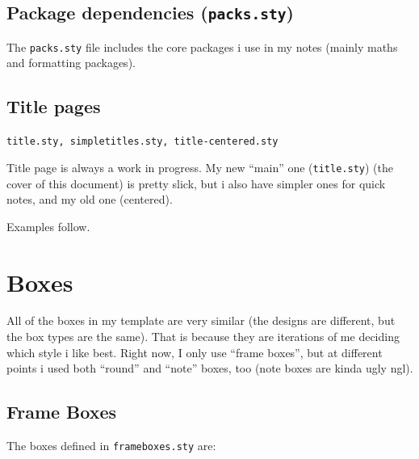 \documentclass[a4paper,12pt]{report}
\begin{document}
\section{Package dependencies (\texttt{packs.sty})}

The \texttt{packs.sty} file includes the core packages i use in my notes (mainly maths and formatting packages).

\section{Title pages}
\texttt{title.sty, simpletitles.sty, title-centered.sty}

Title page is always a work in progress. My new ``main'' one (\texttt{title.sty}) (the cover of this document) is pretty slick, but i also have simpler ones for quick notes, and my old one (centered).

Examples follow.



\chapter{Boxes}

All of the boxes in my template are very similar (the designs are different, but the box types are the same). That is because they are iterations of me deciding which style i like best. Right now, I only use ``frame boxes'', but at different points i used both ``round'' and ``note'' boxes, too (note boxes are kinda ugly ngl).


\section{Frame Boxes}

The boxes defined in \texttt{frameboxes.sty} are:
\end{document}
